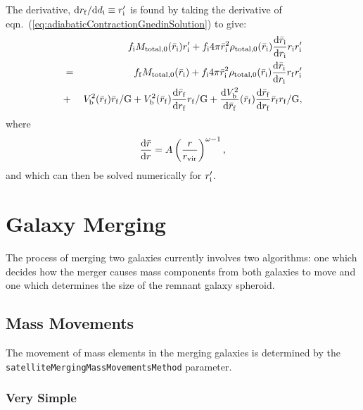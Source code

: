 The derivative, ${\rm d} r_{\rm f}/{\rm d}d_{\rm i}\equiv r^\prime_{\rm i}$ is found by taking the derivative of eqn.~(\ref{eq:adiabaticContractionGnedinSolution}) to give:
\begin{eqnarray}
 &   & f_{\rm i} M_{\rm total,0}(\bar{r}_{\rm i}) r^\prime_{\rm i} + f_{\rm i} 4 \pi \bar{r}_{\rm i}^2 \rho_{\rm total,0}(\bar{r}_{\rm i}) {{\rm d} \bar{r}_{\rm i}\over{\rm d} r_{\rm i}} r_{\rm i} r^\prime_{\rm i} \nonumber \\
 & = & f_{\rm f} M_{\rm total,0}(\bar{r}_{\rm i}) +  f_{\rm i} 4 \pi \bar{r}_{\rm i}^2 \rho_{\rm total,0}(\bar{r}_{\rm i}) {{\rm d} \bar{r}_{\rm i}\over{\rm d} r_{\rm i}} r_{\rm f} r^\prime_{\rm i} \nonumber \\
 & + & V^2_{\rm b}(\bar{r}_{\rm f}) \bar{r}_{\rm f} / {\rm G} +  V^2_{\rm b}(\bar{r}_{\rm f}) {{\rm d}\bar{r}_{\rm f}\over {\rm d} r_{\rm f}} r_{\rm f}/ {\rm G} +  {{\rm d}V^2_{\rm b}\over{\rm d} \bar{r}_{\rm f}}(\bar{r}_{\rm f}) {{\rm d}\bar{r}_{\rm f}\over {\rm d} r_{\rm f}} \bar{r}_{\rm f} r_{\rm f}/ {\rm G},
\end{eqnarray}
where
\begin{equation}
 {{\rm d}\bar{r} \over {\rm d} r} = A \left({r \over r_{\rm vir}}\right)^{\omega-1},
\end{equation}
and which can then be solved numerically for $r^\prime_{\rm i}$.

\section{Galaxy Merging}

The process of merging two galaxies currently involves two algorithms: one which decides how the merger causes mass components from both galaxies to move and one which determines the size of the remnant galaxy spheroid.

\subsection{Mass Movements}\label{sec:MergingMassMovements}

The movement of mass elements in the merging galaxies is determined by the {\tt satelliteMergingMassMovementsMethod} parameter. 

\subsubsection{Very Simple}

